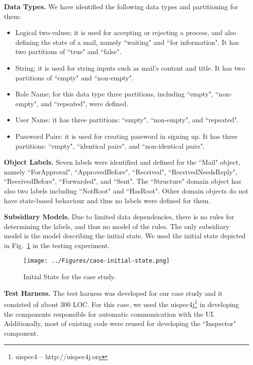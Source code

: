 \textbf{Data Types.}  We have identified the following data types and partitioning for them:
\begin{itemize}
	\item Logical two-values; it is used for accepting or rejecting a process, and also defining the state of a mail, namely ``waiting" and ``for information". It has two partitions of ``true" and ``false".
	
	\item String; it is used for string inputs such as mail's content and title. It has two partitions of ``empty" and ``non-empty". 
	
	\item Role Name; for this data type three partitions, including ``empty", ``non-empty", and ``repeated",  were defined.
	
	\item User Name: it has three partitions: ``empty", ``non-empty", and ``repeated".
	
	\item Password Pairs: it is used for creating password in signing up. It has three partitions: ``empty", ``identical pairs", and ``non-identical pairs".
\end{itemize}

 \textbf{Object Labels.} Seven labels were identified and defined for the ``Mail" object, namely ``ForApproval", ``ApprovedBefore", ``Received", ``ReceivedNeedsReply", ``ReceivedBefore", ``Forwarded", and ``Sent". The ``Structure" domain object has also two labels including ``NotRoot" and ``HasRoot". Other domain objects do not have state-based behaviour and thus no labels were defined for them.

\textbf{Subsidiary Models.} Due to limited data dependencies, there is no rules for determining the labels, and thus no model of the rules. The only subsidiary model is the model describing the initial state. We used the initial state depicted in Fig.~\ref{fig:case-initial-state} in the testing experiment.

\begin{figure}[h]
\centering
\texttt{[image: ../Figures/case-initial-state.png]}
\caption{Initial State for the case study.}
\label{fig:case-initial-state}
\end{figure}

\textbf{Test Harness.} The test harness was developed for our case study and it consisted of about 300 LOC. For this case, we used the uispec4j\footnote{ uispec4 – http://uispec4j.org} in developing the components responsible for automatic communication with the UI. Additionally, most of existing code were reused for developing the ``Inspector" component.
 

